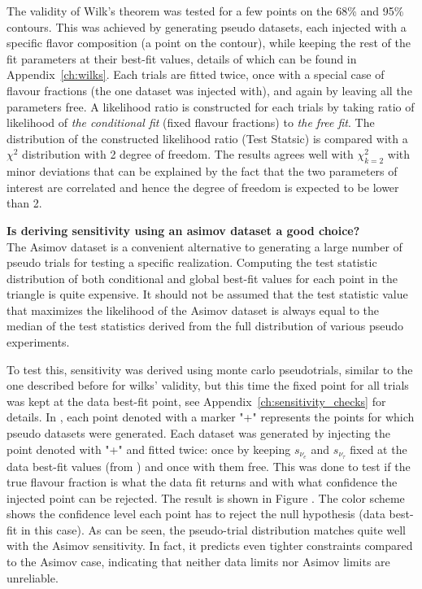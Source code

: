 The validity of Wilk's theorem was tested for a few points on the 68\% and 95\% contours. This was achieved by generating pseudo datasets, each injected with a specific flavor composition (a point on the contour), while keeping the rest of the fit parameters at their best-fit values, details of which can be found in Appendix~\ref{ch:wilks}. Each trials are fitted twice, once with a special case of flavour fractions (the one dataset was injected with), and again by leaving all the parameters free. A likelihood ratio is constructed for each trials by taking ratio of likelihood of \emph{the conditional fit} (fixed flavour fractions) to \emph{the free fit}. The distribution of the constructed likelihood ratio (Test Statsic) is compared with a $\chi^2$ distribution with 2 degree of freedom. The results agrees well with $\chi_{k=2}^2$ with minor deviations that can be explained by the fact that the two parameters of interest are correlated and hence the degree of freedom is expected to be lower than 2.  
     
\textbf{Is deriving sensitivity using an asimov dataset a good choice?}\\
The Asimov dataset is a convenient alternative to generating a large number of pseudo trials for testing a specific realization. Computing the test statistic distribution of both conditional and global best-fit values for each point in the triangle is quite expensive. It should not be assumed that the test statistic value that maximizes the likelihood of the Asimov dataset is always equal to the median of the test statistics derived from the full distribution of various pseudo experiments. 

To test this, sensitivity was derived using monte carlo pseudotrials, similar to the one described before for wilks' validity, but this time the fixed point for all trials was kept at the data best-fit point, see Appendix~\ref{ch:sensitivity_checks} for details. In , each point denoted with a marker "+" represents the points for which pseudo datasets were generated. Each dataset was generated by injecting the point denoted with "+" and fitted twice: once by keeping $s_{\nu_{e}}$ and $s_{\nu_{\tau}}$ fixed at the data best-fit values (from ) and once with them free. This was done to test if the true flavour fraction is what the data fit returns and with what confidence the injected point can be rejected. The result is shown in Figure . The color scheme shows the confidence level each point has to reject the null hypothesis (data best-fit in this case). As can be seen, the pseudo-trial distribution matches quite well with the Asimov sensitivity. In fact, it predicts even tighter constraints compared to the Asimov case, indicating that neither data limits nor Asimov limits are unreliable.

